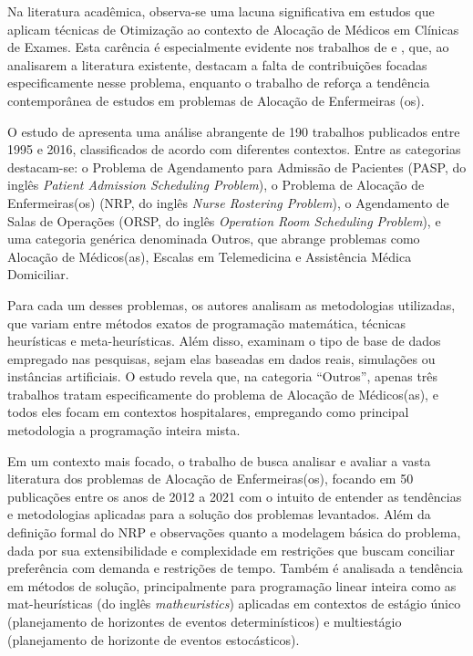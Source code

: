 \label{cap:revisao-bibliografica}

Na literatura acadêmica, observa-se uma lacuna significativa em estudos que aplicam técnicas de Otimização ao contexto de Alocação de Médicos em Clínicas de Exames. Esta carência é especialmente evidente nos trabalhos de  e , que, ao analisarem a literatura existente, destacam a falta de contribuições focadas especificamente nesse problema, enquanto o trabalho de  reforça a tendência contemporânea de estudos em problemas de Alocação de Enfermeiras (os).

O estudo de  apresenta uma análise abrangente de 190 trabalhos publicados entre 1995 e 2016, classificados de acordo com diferentes contextos. Entre as categorias destacam-se: o Problema de Agendamento para Admissão de Pacientes (PASP, do inglês \textit{Patient Admission Scheduling Problem}), o Problema de Alocação de Enfermeiras(os) (NRP, do inglês \textit{Nurse Rostering Problem}), o Agendamento de Salas de Operações (ORSP, do inglês \textit{Operation Room Scheduling Problem}), e uma categoria genérica denominada Outros, que abrange problemas como Alocação de Médicos(as), Escalas em Telemedicina e Assistência Médica Domiciliar.

Para cada um desses problemas, os autores analisam as metodologias utilizadas, que variam entre métodos exatos de programação matemática, técnicas heurísticas e meta-heurísticas. Além disso, examinam o tipo de base de dados empregado nas pesquisas, sejam elas baseadas em dados reais, simulações ou instâncias artificiais. O estudo revela que, na categoria ``Outros'', apenas três trabalhos tratam especificamente do problema de Alocação de Médicos(as), e todos eles focam em contextos hospitalares, empregando como principal metodologia a programação inteira mista.

Em um contexto mais focado, o trabalho de  busca analisar e avaliar a vasta literatura dos problemas de Alocação de Enfermeiras(os), focando em 50 publicações entre os anos de 2012 a 2021 com o intuito de entender as tendências e metodologias aplicadas para a solução dos problemas levantados. Além da definição formal do NRP e observações quanto a modelagem básica do problema, dada por sua extensibilidade e complexidade em restrições que buscam conciliar preferência com demanda e restrições de tempo. Também é analisada a tendência em métodos de solução, principalmente para programação linear inteira como as  mat-heurísticas (do inglês \textit{matheuristics}) aplicadas em contextos de estágio único (planejamento de horizontes de eventos determinísticos) e multiestágio (planejamento de horizonte de eventos estocásticos).

